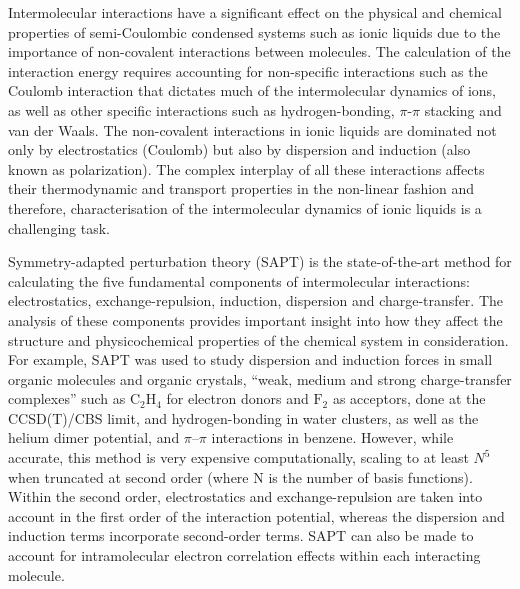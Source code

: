 

Intermolecular interactions have a significant effect on the physical and chemical properties of semi-Coulombic condensed systems such as ionic liquids due to the importance of non-covalent interactions between molecules. 
The calculation of the interaction energy requires accounting for non-specific interactions such as the Coulomb interaction that dictates much of the intermolecular dynamics of ions, as well as other specific interactions such as hydrogen-bonding, $\pi$-$\pi$ stacking and van der Waals.
\cite{Wendler2012a, Bedrov2010a, Izgorodina2011a}
The non-covalent interactions in ionic liquids are dominated not only by electrostatics (Coulomb) but also by dispersion and induction (also known as polarization). 
\cite{Izgorodina2011b, Izgorodina2014a}
The complex interplay of all these interactions affects their thermodynamic and transport properties in the non-linear fashion\cite{Izgorodina2014a} and therefore, characterisation of the intermolecular dynamics of ionic liquids is a challenging task. 
\cite{Izgorodina2011a}


Symmetry-adapted perturbation theory (SAPT)
\cite{Misquitta2008a, Misquitta2008b, Parker2014a}
is the state-of-the-art method for calculating the five fundamental components of intermolecular interactions: electrostatics, exchange-repulsion, induction, dispersion and charge-transfer.
The analysis of these components provides important insight into how they affect the structure and physicochemical properties of the chemical system in consideration.
\cite{Stone1996a, Turney2012a}
For example, SAPT was used to study dispersion
\cite{Misquitta2005a} and
induction forces in small organic molecules and organic crystals,
\cite{Misquitta2008a, Misquitta2008b, Welch2008a}
``weak, medium and strong charge-transfer complexes'' such as $\text{C}_2\text{H}_4$ for electron donors and $\text{F}_2$ as acceptors, done at the CCSD(T)/CBS limit,
\cite{Karthikeyan2011a}
and hydrogen-bonding in water clusters,
\cite{Milet1999a} 
as well as the helium dimer potential,
\cite{Korona1997a}
and $\pi \text{--} \pi$ interactions in benzene.
\cite{Sinnokrot2004a, Sinnokrot2006a}
However, while accurate, this method is very expensive computationally, scaling to at least $N^5$ when truncated at second order (where N is the number of basis functions).
Within the second order, electrostatics and exchange-repulsion are taken into account in the first order of the interaction potential, whereas the dispersion and induction terms incorporate second-order terms. SAPT can also be made to account for intramolecular electron correlation effects within each interacting molecule.


